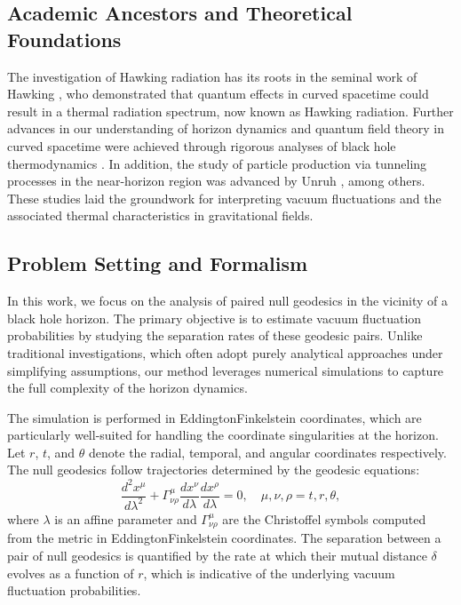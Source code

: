 \documentclass{article}\usepackage[utf8]{inputenc} %
\begin{document}
\subsection{Academic Ancestors and Theoretical Foundations}
The investigation of Hawking radiation has its roots in the seminal work of Hawking \cite{Hawking1975}, who demonstrated that quantum effects in curved spacetime could result in a thermal radiation spectrum, now known as Hawking radiation. Further advances in our understanding of horizon dynamics and quantum field theory in curved spacetime were achieved through rigorous analyses of black hole thermodynamics \cite{Jacobson1993}. In addition, the study of particle production via tunneling processes in the near-horizon region was advanced by Unruh \cite{Unruh1976}, among others. These studies laid the groundwork for interpreting vacuum fluctuations and the associated thermal characteristics in gravitational fields.

\subsection{Problem Setting and Formalism}
In this work, we focus on the analysis of paired null geodesics in the vicinity of a black hole horizon. The primary objective is to estimate vacuum fluctuation probabilities by studying the separation rates of these geodesic pairs. Unlike traditional investigations, which often adopt purely analytical approaches under simplifying assumptions, our method leverages numerical simulations to capture the full complexity of the horizon dynamics.

The simulation is performed in Eddington\textendash Finkelstein coordinates, which are particularly well-suited for handling the coordinate singularities at the horizon. Let $r$, $t$, and $\theta$ denote the radial, temporal, and angular coordinates respectively. The null geodesics follow trajectories determined by the geodesic equations:
\begin{equation}
\frac{d^2 x^\mu}{d\lambda^2} + \Gamma^\mu_{\nu \rho}\frac{dx^\nu}{d\lambda}\frac{dx^\rho}{d\lambda} = 0, \quad \mu,\nu,\rho = t,r,\theta, \label{eq:geodesic}
\end{equation}
where $\lambda$ is an affine parameter and $\Gamma^\mu_{\nu \rho}$ are the Christoffel symbols computed from the metric in Eddington\textendash Finkelstein coordinates. The separation between a pair of null geodesics is quantified by the rate at which their mutual distance $\delta$ evolves as a function of $r$, which is indicative of the underlying vacuum fluctuation probabilities.
\end{document}
